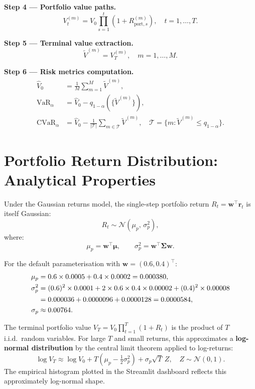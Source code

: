 \documentclass[12pt, a4paper]{article}
\begin{document}
\noindent\textbf{Step 4 — Portfolio value paths.}
\[
    V^{(m)}_t = V_0 \prod_{s=1}^{t}(1 + R^{(m)}_{\text{port},s}), \quad t = 1,\ldots,T.
\]

\noindent\textbf{Step 5 — Terminal value extraction.}
\[
    \widetilde{V}^{(m)} = V^{(m)}_T, \quad m = 1,\ldots,M.
\]

\noindent\textbf{Step 6 — Risk metrics computation.}
\begin{align*}
    \hat{V}_0 &= \frac{1}{M}\sum_{m=1}^{M}\widetilde{V}^{(m)}, \\
    \mathrm{VaR}_\alpha &= \hat{V}_0 - q_{1-\alpha}(\{\widetilde{V}^{(m)}\}), \\
    \mathrm{CVaR}_\alpha &= \hat{V}_0 - \frac{1}{|\mathcal{T}|}\sum_{m \in \mathcal{T}}\widetilde{V}^{(m)},
    \quad \mathcal{T} = \{m : \widetilde{V}^{(m)} \leq q_{1-\alpha}\}.
\end{align*}

\section{Portfolio Return Distribution: Analytical Properties}

Under the Gaussian returns model, the single-step portfolio return $R_t =
\bm{w}^\top\bm{r}_t$ is itself Gaussian:
\begin{equation}
    R_t \sim \mathcal{N}\!\left(\mu_p,\, \sigma_p^2\right),
\end{equation}
where:
\begin{equation}
    \mu_p = \bm{w}^\top\bm{\mu}, \qquad \sigma_p^2 = \bm{w}^\top\bm{\Sigma}\bm{w}.
    \label{eq:port_moments}
\end{equation}

For the default parameterisation with $\bm{w} = (0.6, 0.4)^\top$:
\begin{align}
    \mu_p &= 0.6 \times 0.0005 + 0.4 \times 0.0002 = 0.000380, \\
    \sigma_p^2 &= (0.6)^2 \times 0.0001
              + 2 \times 0.6 \times 0.4 \times 0.00002
              + (0.4)^2 \times 0.00008 \notag \\
              &= 0.000036 + 0.0000096 + 0.0000128 = 0.0000584, \\
    \sigma_p &\approx 0.00764.
\end{align}

The terminal portfolio value $V_T = V_0\prod_{t=1}^T(1+R_t)$ is the product of
$T$ i.i.d.\ random variables. For large $T$ and small returns, this
approximates a \textbf{log-normal distribution} by the central limit theorem
applied to log-returns:
\[
    \log V_T \approx \log V_0 + T\!\left(\mu_p - \tfrac{1}{2}\sigma_p^2\right)
    + \sigma_p\sqrt{T}\,Z, \quad Z \sim \mathcal{N}(0,1).
\]
The empirical histogram plotted in the Streamlit dashboard reflects this
approximately log-normal shape.
\end{document}
